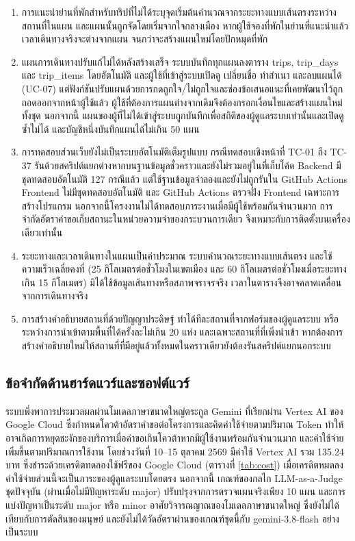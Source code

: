 \begin{enumerate}
\item การแนะนำย่านที่พักสำหรับทริปที่ไม่ได้ระบุจุดเริ่มต้นคำนวณจากระยะทางแบบเส้นตรงระหว่างสถานที่ในแผน และแผนนั้นถูกจัดโดยเริ่มจากใจกลางเมือง หากผู้ใช้จองที่พักในย่านที่แนะนำแล้ว เวลาเดินทางจริงจะต่างจากแผน จนกว่าจะสร้างแผนใหม่โดยปักหมุดที่พัก
\item แผนการเดินทางปรับแก้ไม่ได้หลังสร้างเสร็จ ระบบบันทึกทุกแผนลงตาราง trips, trip\_days และ trip\_items โดยอัตโนมัติ และผู้ใช้ที่เข้าสู่ระบบเปิดดู เปลี่ยนชื่อ ทำสำเนา และลบแผนได้ (UC-07) แต่ฟังก์ชันปรับแผนด้วยการกดถูกใจ/ไม่ถูกใจและช่องข้อเสนอแนะที่เคยพัฒนาไว้ถูกถอดออกจากหน้าผู้ใช้แล้ว ผู้ใช้ที่ต้องการแผนต่างจากเดิมจึงต้องกรอกเงื่อนไขและสร้างแผนใหม่ทั้งชุด นอกจากนี้ แผนของผู้ที่ไม่ได้เข้าสู่ระบบถูกบันทึกเพื่อสถิติของผู้ดูแลระบบเท่านั้นและเปิดดูซ้ำไม่ได้ และบัญชีหนึ่งบันทึกแผนได้ไม่เกิน 50 แผน
\item การทดสอบส่วนเว็บยังไม่เป็นระบบอัตโนมัติเต็มรูปแบบ กรณีทดสอบเชิงหน้าที่ TC-01 ถึง TC-37 รันด้วยสคริปต์แยกต่างหากบนฐานข้อมูลชั่วคราวและยังไม่รวมอยู่ในที่เก็บโค้ด Backend มีชุดทดสอบอัตโนมัติ 127 กรณีแล้ว แต่ใช้ฐานข้อมูลจำลองและยังไม่ถูกรันใน GitHub Actions Frontend ไม่มีชุดทดสอบอัตโนมัติ และ GitHub Actions ตรวจฝั่ง Frontend เฉพาะการสร้างโปรแกรม นอกจากนี้โครงงานไม่ได้ทดสอบภาระงานเมื่อมีผู้ใช้พร้อมกันจำนวนมาก การจำกัดอัตราคำขอเก็บสถานะในหน่วยความจำของกระบวนการเดียว จึงเหมาะกับการติดตั้งบนเครื่องเดียวเท่านั้น
\item ระยะทางและเวลาเดินทางในแผนเป็นค่าประมาณ ระบบคำนวณระยะทางแบบเส้นตรง และใช้ความเร็วเฉลี่ยคงที่ (25 กิโลเมตรต่อชั่วโมงในเขตเมือง และ 60 กิโลเมตรต่อชั่วโมงเมื่อระยะทางเกิน 15 กิโลเมตร) มิได้ใช้ข้อมูลเส้นทางหรือสภาพจราจรจริง เวลาในตารางจึงอาจคลาดเคลื่อนจากการเดินทางจริง
\item การสร้างคำอธิบายสถานที่ด้วยปัญญาประดิษฐ์ ทำได้ทีละสถานที่จากฟอร์มของผู้ดูแลระบบ หรือระหว่างการนำเข้าตามพื้นที่ได้ครั้งละไม่เกิน 20 แห่ง และเฉพาะสถานที่ที่เพิ่งนำเข้า หากต้องการสร้างคำอธิบายใหม่ให้สถานที่ที่มีอยู่แล้วทั้งหมดในคราวเดียวยังต้องรันสคริปต์แยกนอกระบบ
\end{enumerate}
\endgroup

\subsection{ข้อจำกัดด้านฮาร์ดแวร์และซอฟต์แวร์}

ระบบพึ่งพาการประมวลผลผ่านโมเดลภาษาขนาดใหญ่ตระกูล Gemini ที่เรียกผ่าน Vertex AI ของ Google Cloud ซึ่งกำหนดโควต้าอัตราคำขอต่อโครงการและคิดค่าใช้จ่ายตามปริมาณ Token ทำให้อาจเกิดการหยุดชะงักของบริการเมื่อคำขอเกินโควต้าหากมีผู้ใช้งานพร้อมกันจำนวนมาก และค่าใช้จ่ายเพิ่มขึ้นตามปริมาณการใช้งาน โดยช่วงวันที่ 10--15 ตุลาคม 2569 มีค่าใช้ Vertex AI รวม 135.24 บาท ซึ่งชำระด้วยเครดิตทดลองใช้ฟรีของ Google Cloud (ตารางที่ \ref{tab:cost}) เมื่อเครดิตหมดลงค่าใช้จ่ายส่วนนี้จะเป็นภาระของผู้ดูแลระบบโดยตรง นอกจากนี้ เกณฑ์ของกลไก LLM-as-a-Judge ชุดปัจจุบัน (ผ่านเมื่อไม่มีปัญหาระดับ major) ปรับปรุงจากการตรวจแผนจริงเพียง 10 แผน และการแบ่งปัญหาเป็นระดับ major หรือ minor อาศัยวิจารณญาณของโมเดลภาษาขนาดใหญ่ ซึ่งยังไม่ได้เทียบกับการตัดสินของมนุษย์ และยังไม่ได้วัดอัตราผ่านของเกณฑ์ชุดนี้กับ gemini-3.8-flash อย่างเป็นระบบ

